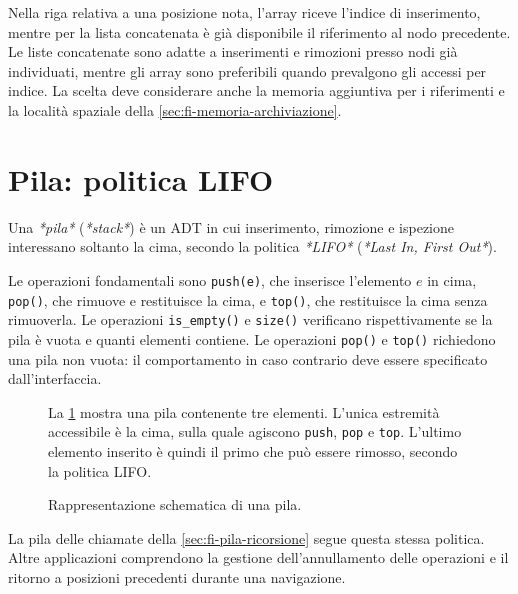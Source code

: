 Nella riga relativa a una posizione nota, l'array riceve
l'indice di inserimento, mentre per la lista concatenata
è già disponibile il riferimento al nodo precedente.
Le liste concatenate sono adatte a inserimenti e rimozioni
presso nodi già individuati, mentre gli array sono preferibili
quando prevalgono gli accessi per indice. La scelta deve
considerare anche la memoria aggiuntiva per i riferimenti
e la località spaziale della \cref{sec:fi-memoria-archiviazione}.

\section{Pila: politica LIFO}
\label{sec:fi-adt-pila}

\begin{definition}[Pila]
\label{def:fi-adt-pila}
Una \emph{*pila*} (\emph{*stack*}) è un ADT in cui inserimento,
rimozione e ispezione interessano soltanto la cima, secondo la
politica \emph{*LIFO*} (\emph{*Last In, First Out*}).
\end{definition}

Le operazioni fondamentali sono \texttt{push(e)}, che inserisce
l'elemento \(e\) in cima, \texttt{pop()}, che rimuove e restituisce
la cima, e \texttt{top()}, che restituisce la cima senza rimuoverla.
Le operazioni \texttt{is\_empty()} e \texttt{size()} verificano
rispettivamente se la pila è vuota e quanti elementi contiene.
Le operazioni \texttt{pop()} e \texttt{top()} richiedono una pila
non vuota: il comportamento in caso contrario deve essere
specificato dall'interfaccia.

\begin{figure}[htbp]
  \begin{minipage}[c]{0.54\textwidth}
    La \cref{fig:fi-pila} mostra una pila contenente tre elementi.
    L'unica estremità accessibile è la cima, sulla quale agiscono
    \texttt{push}, \texttt{pop} e \texttt{top}. L'ultimo elemento
    inserito è quindi il primo che può essere rimosso, secondo la
    politica LIFO.
  \end{minipage}
  \hfill
  \begin{minipage}[c]{0.40\textwidth}
    \centering
    \resizebox{0.82\linewidth}{!}{%
    }
  \end{minipage}
  \caption{Rappresentazione schematica di una pila.}
  \label{fig:fi-pila}
\end{figure}

La pila delle chiamate della \cref{sec:fi-pila-ricorsione} segue
questa stessa politica. Altre applicazioni comprendono la gestione
dell'annullamento delle operazioni e il ritorno a posizioni
precedenti durante una navigazione.

